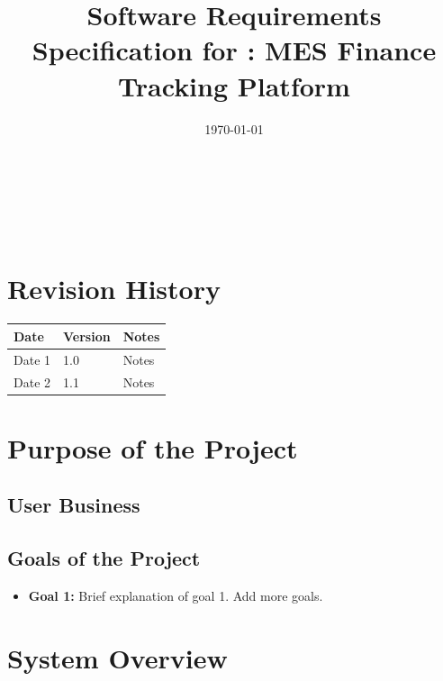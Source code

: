\documentclass[12pt]{article}
\begin{document}
\title{Software Requirements Specification for \progname: MES Finance Tracking Platform} 
\author{\authname}
\date{\today}
	
\maketitle

~\newpage


\tableofcontents

~\newpage

\section*{Revision History}

\begin{tabularx}{\textwidth}{p{3cm}p{2cm}X}
  \toprule {\bf Date} & {\bf Version} & {\bf Notes}\\
    \midrule
      Date 1 & 1.0 & Notes\\
      Date 2 & 1.1 & Notes\\
  \bottomrule
\end{tabularx}

\newpage
{}


\section{Purpose of the Project}

  \subsection{User Business}


  \subsection{Goals of the Project}
  \begin{itemize}
      \item \textbf{Goal 1:} Brief explanation of goal 1. Add more goals.
  \end{itemize}

\section{System Overview}
\end{document}
